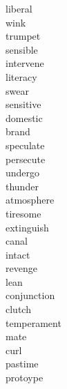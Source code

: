 \documentclass[a4paper, 10pt]{ctexart}
\begin{document}
\begin{multicols*}{2}
\begin{description}
\item[liberal]

\item[wink]

\item[trumpet]

\item[sensible]

\item[intervene]

\item[literacy]

\item[swear]

\item[sensitive]

\item[domestic]

\item[brand]

\item[speculate]

\item[persecute]

\item[undergo]

\item[thunder]

\item[atmosphere]

\item[tiresome]

\item[extinguish]

\item[canal]

\item[intact]

\item[revenge]

\item[lean]

\item[conjunction]

\item[clutch]

\item[temperament]

\item[mate]

\item[curl]

\item[pastime]

\item[protoype]


\end{description}
\end{multicols*}
\end{document}
